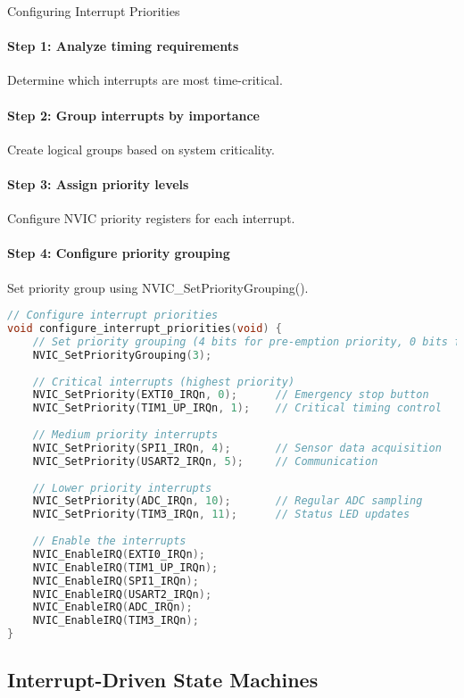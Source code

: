 \begin{KR}{Configuring Interrupt Priorities}
\paragraph{Step 1: Analyze timing requirements}
Determine which interrupts are most time-critical.
\paragraph{Step 2: Group interrupts by importance}
Create logical groups based on system criticality.
\paragraph{Step 3: Assign priority levels}
Configure NVIC priority registers for each interrupt.
\paragraph{Step 4: Configure priority grouping}
Set priority group using NVIC\_SetPriorityGrouping().

\begin{lstlisting}[language=C, style=basesmol]
// Configure interrupt priorities
void configure_interrupt_priorities(void) {
    // Set priority grouping (4 bits for pre-emption priority, 0 bits for sub-priority)
    NVIC_SetPriorityGrouping(3);
    
    // Critical interrupts (highest priority)
    NVIC_SetPriority(EXTI0_IRQn, 0);      // Emergency stop button
    NVIC_SetPriority(TIM1_UP_IRQn, 1);    // Critical timing control
    
    // Medium priority interrupts
    NVIC_SetPriority(SPI1_IRQn, 4);       // Sensor data acquisition
    NVIC_SetPriority(USART2_IRQn, 5);     // Communication
    
    // Lower priority interrupts
    NVIC_SetPriority(ADC_IRQn, 10);       // Regular ADC sampling
    NVIC_SetPriority(TIM3_IRQn, 11);      // Status LED updates
    
    // Enable the interrupts
    NVIC_EnableIRQ(EXTI0_IRQn);
    NVIC_EnableIRQ(TIM1_UP_IRQn);
    NVIC_EnableIRQ(SPI1_IRQn);
    NVIC_EnableIRQ(USART2_IRQn);
    NVIC_EnableIRQ(ADC_IRQn);
    NVIC_EnableIRQ(TIM3_IRQn);
}
\end{lstlisting}
\end{KR}

\raggedcolumns
\pagebreak

\subsection{Interrupt-Driven State Machines}

